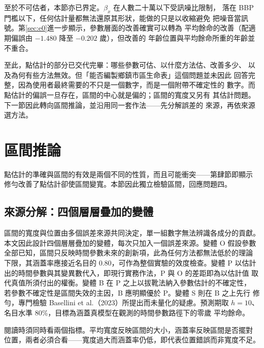 \documentclass[UTF8, fontset=macnew, a4paper, 12pt]{ctexart}
\begin{document}
至於不可估者，本節亦已界定。$\beta_x$ 在人數二十萬以下受訊噪比限制，
落在 BBP 門檻以下，任何估計量都無法還原其形狀，能做的只是以收縮避免
把噪音當訊號。第\ref{sec:e0}進一步顯示，參數層面的改善確實可以轉為
平均餘命的改善（配適期偏誤由 $-1.480$ 降至 $-0.202$ 歲），但改善的
年齡位置與平均餘命所重的年齡並不重合。

至此，點估計的部分已交代完畢：哪些參數可估、以什麼方法估、改善多少、
以及為何有些方法無效。但「能否編製鄉鎮市區生命表」這個問題並未因此
回答完整，因為使用者最終需要的不只是一個數字，而是一個附帶不確定性的
數字。而點估計的偏誤一旦存在，區間的中心就是偏的；區間的寬度又另有
其估計問題。下一節因此轉向區間推論，並沿用同一套作法——先分解誤差的
來源，再依來源選方法。

\section{區間推論}\label{sec:interval}

點估計的準確與區間的有效是兩個不同的性質，而且可能衝突——第肆節即顯示
修勻改善了點估計卻使區間變寬。本節因此獨立檢驗區間，回應問題四。

\subsection{來源分解：四個層層疊加的變體}\label{sec:isrc}

區間的寬度與位置由多個誤差來源共同決定，單一組數字無法辨識各成分的貢獻。
本文因此設計四個層層疊加的變體，每次只加入一個誤差來源。變體 O 假設參數
全部已知，區間只反映時間參數未來的創新項，此為任何方法都無法低於的理論
下限，其涵蓋率應接近名目的 0.80，可作為整個實驗的效度檢查。變體 P 以估計
出的時間參數與其變異數代入，即現行實務作法，P 與 O 的差距即為以估計值
取代真值所須付出的權衡。變體 B 在 P 之上以拔靴法納入參數估計的不確定性，
若參數不確定性是區間失效的主因，B 應明顯優於 P。變體 S 則在 B 之上先行
修勻，專門檢驗 Basellini et al.（2023）所提出而未量化的疑慮。預測期取
$h=10$、名目水準 80\%，目標為涵蓋真模型在觀測的時間參數路徑下的零歲
平均餘命。

閱讀時須同時看兩個指標。平均寬度反映區間的大小，涵蓋率反映區間是否擺對
位置，兩者必須合看——寬度過大而涵蓋率仍低，即代表位置錯誤而非寬度不足。
\end{document}
